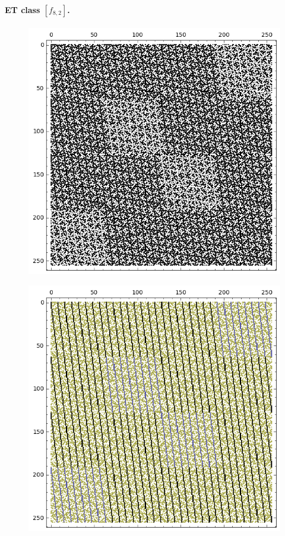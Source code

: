 \documentclass[12pt,a4paper]{article}
\begin{document}
\paragraph*{ET class $[f_{8,2}]$.}
\begin{figure}[!hb]
\centering
\begin{minipage}{.48\textwidth}
  \centering
  \includegraphics[width=.9\linewidth]{../matrix_plot/re8_2_weight_class_matrix.png}
  \label{fig:8_2_weight_class_matrix}
\end{minipage}%
\begin{minipage}{.48\textwidth}
  \centering
  \includegraphics[width=.9\linewidth]{../matrix_plot/re8_2_bent_cayley_graph_index_matrix.png}
  \label{fig:8_2_bent_cayley_graph_index_matrix}
\end{minipage}
\end{figure}
~
\end{document}
